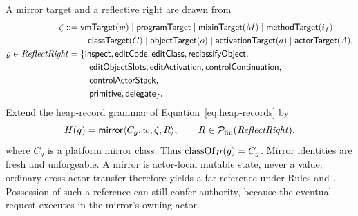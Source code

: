 A mirror target and a reflective right are drawn from
\begin{equation}\label{eq:mirror-targets-rights}
\begin{split}
 \zeta::={}&\mathsf{vmTarget}(w)\mid\mathsf{programTarget}
  \mid\mathsf{mixinTarget}(M)\mid\mathsf{methodTarget}(i_f)\\
 &\mid\mathsf{classTarget}(C)\mid\mathsf{objectTarget}(o)
  \mid\mathsf{activationTarget}(a)\mid\mathsf{actorTarget}(A),\\
 \varrho\in\mathit{ReflectRight}={}&
 \{\mathsf{inspect},\mathsf{editCode},\mathsf{editClass},\mathsf{reclassifyObject},\\
 &\quad\mathsf{editObjectSlots},\mathsf{editActivation},\mathsf{controlContinuation},\\
 &\quad\mathsf{controlActorStack},\\
 &\quad
       \mathsf{primitive},\mathsf{delegate}\}.
\end{split}
\end{equation}
Extend the heap-record grammar of Equation~\eqref{eq:heap-records} by
\begin{equation}\label{eq:mirror-record}
 H(g)=\mathsf{mirror}\langle C_g,w,\zeta,R\rangle,
 \qquad R\in\mathcal P_{\mathrm{fin}}(\mathit{ReflectRight}),
\end{equation}
where $C_g$ is a platform mirror class.  Thus $\mathop{\mathrm{classOf}}_H(g)=C_g$.
Mirror identities are fresh and unforgeable.  A mirror is actor-local mutable
state, never a value; ordinary cross-actor transfer therefore yields a far
reference under Rules  and .
Possession of such a reference can still confer authority, because the
eventual request executes in the mirror's owning actor.

